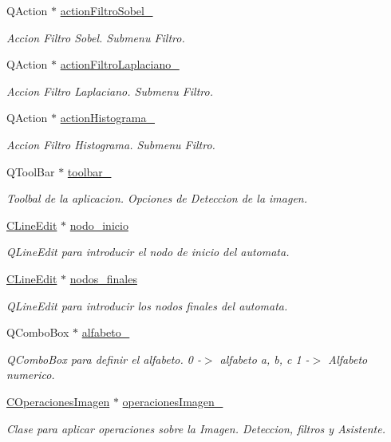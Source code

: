 \begin{DoxyCompactItemize}
Q\+Action $\ast$ \hyperlink{classCAplicacion_a96511c94f6a4a6da0466d460272f56bf}{action\+Filtro\+Sobel\+\_\+}
\begin{DoxyCompactList}\small\item\em Accion Filtro Sobel. Submenu Filtro. \end{DoxyCompactList}\item 
Q\+Action $\ast$ \hyperlink{classCAplicacion_ad1cce3c330ee913f1129d19bba5f22f0}{action\+Filtro\+Laplaciano\+\_\+}
\begin{DoxyCompactList}\small\item\em Accion Filtro Laplaciano. Submenu Filtro. \end{DoxyCompactList}\item 
Q\+Action $\ast$ \hyperlink{classCAplicacion_a60f0707037ad02949ff17858729faff2}{action\+Histograma\+\_\+}
\begin{DoxyCompactList}\small\item\em Accion Filtro Histograma. Submenu Filtro. \end{DoxyCompactList}\item 
Q\+Tool\+Bar $\ast$ \hyperlink{classCAplicacion_a2dca58bda4c34c0f76d8c95fcbba064c}{toolbar\+\_\+}
\begin{DoxyCompactList}\small\item\em Toolbal de la aplicacion. Opciones de Deteccion de la imagen. \end{DoxyCompactList}\item 
\hyperlink{classCLineEdit}{C\+Line\+Edit} $\ast$ \hyperlink{classCAplicacion_a9d3e345fc25efeaf8a160daf22206a8e}{nodo\+\_\+inicio}
\begin{DoxyCompactList}\small\item\em Q\+Line\+Edit para introducir el nodo de inicio del automata. \end{DoxyCompactList}\item 
\hyperlink{classCLineEdit}{C\+Line\+Edit} $\ast$ \hyperlink{classCAplicacion_a483026f954a5a26ddd9ded5863c61b9a}{nodos\+\_\+finales}
\begin{DoxyCompactList}\small\item\em Q\+Line\+Edit para introducir los nodos finales del automata. \end{DoxyCompactList}\item 
Q\+Combo\+Box $\ast$ \hyperlink{classCAplicacion_a2bc2fca932b919c027f2c4a35f837de0}{alfabeto\+\_\+}
\begin{DoxyCompactList}\small\item\em Q\+Combo\+Box para definir el alfabeto. 0 -\/$>$ alfabeto a, b, c 1 -\/$>$ Alfabeto numerico. \end{DoxyCompactList}\item 
\hyperlink{classCOperacionesImagen}{C\+Operaciones\+Imagen} $\ast$ \hyperlink{classCAplicacion_a58596bdd1d1e018bcb8bd58b64de538e}{operaciones\+Imagen\+\_\+}
\begin{DoxyCompactList}\small\item\em Clase para aplicar operaciones sobre la Imagen. Deteccion, filtros y Asistente. \end{DoxyCompactList}\end{DoxyCompactItemize}


